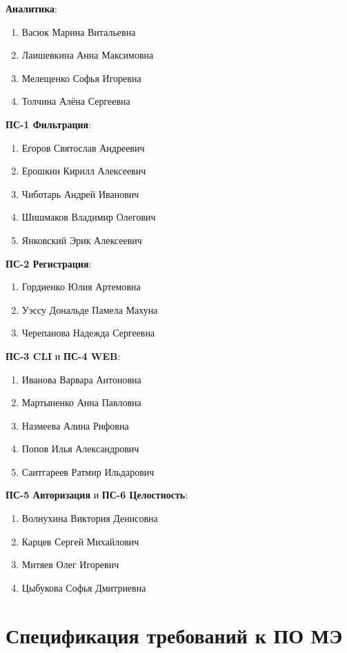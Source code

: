\documentclass[13pt,a4paper,final]{article}
\begin{document}
	\textbf{Аналитика}:
	\begin{enumerate}
		\item Васюк Марина Витальевна
		\item Лаишевкина Анна Максимовна
		\item Мелещенко Софья Игоревна
		\item Толчина Алёна Сергеевна
	\end{enumerate}
	
	\textbf{ПС-1 Фильтрация}:
	\begin{enumerate}
		\item Егоров Святослав Андреевич
		\item Ерошкин Кирилл Алексеевич
		\item Чиботарь Андрей Иванович
		\item Шишмаков Владимир Олегович
		\item Янковский Эрик Алексеевич
	\end{enumerate}
	
	\textbf{ПС-2 Регистрация}:
	\begin{enumerate}
		\item Гордиенко Юлия Артемовна
		\item Уэссу Дональде Памела Махуна
		\item Черепанова Надежда Сергеевна
	\end{enumerate}
	
	\textbf{ПС-3 CLI} и \textbf{ПС-4 WEB}:
	\begin{enumerate}
		\item Иванова Варвара Антоновна
		\item Мартыненко Анна Павловна
		\item Назмеева Алина Рифовна
		\item Попов Илья Александрович
		\item Саитгареев Ратмир Ильдарович
	\end{enumerate}
	
	
	\textbf{ПС-5 \textcolor{edit}{Авторизация}} и \textbf{ПС-6 Целостность}:
	\begin{enumerate}
		\item Волнухина Виктория Денисовна
		\item Карцев Сергей Михайлович
		\item Митяев Олег Игоревич
		\item Цыбукова Софья Дмитриевна
	\end{enumerate}
	
	
	\newpage
	\section{Спецификация требований к ПО МЭ}
\end{document}

